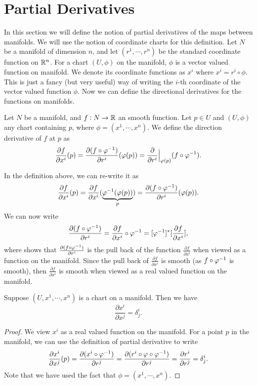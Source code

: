 \section{Partial Derivatives}
In this section we will define the notion of partial derivatives of the maps between manifolds. We will use the notion of coordinate charts for this definition. Let $ N $ be a manifold of dimension $ n $, and let $ (r^1,\cdots,r^n) $ be the standard coordinate function on $ \mathbb{R}^n $. For a chart $ (U,\phi) $ on the manifold, $ \phi $ is a vector valued function on manifold. We denote its coordinate functions as $ x^i $ where $ x^i = r^i \circ \phi $. This is just a fancy (but very useful) way of writing the $ i\text{-th}$ coordinate of the vector valued function $ \phi $. Now we can define the directional derivatives for the functions on manifolds.

\begin{definition}
	Let $ N $ be a manifold, and $ f:N \to \mathbb{R} $ an smooth function. Let $ p\in U $ and $ (U,\phi) $ any chart containing $ p $, where $ \phi = (x^1,\cdots,x^n) $. We define the direction derivative of $ f $ at $ p $ as 
	\[ \frac{\partial f}{\partial x^i}(p) = \frac{\partial (f\circ \varphi^{-1})}{\partial r^i}(\varphi(p)) = \frac{\partial}{\partial r^i}\big|_{\varphi(p)} (f\circ\varphi^{-1}). \]
\end{definition}

\begin{remark}
	In the definition above, we can re-write it as
	\[ \frac{\partial f}{\partial x^i}(p) =\frac{\partial f}{\partial x^i}(\underbrace{\varphi^{-1}(\varphi(p))}_{p}) = \frac{\partial (f\circ \varphi^{-1})}{\partial r^i}(\varphi(p)). \]
	We can now write
	\[ \frac{\partial (f\circ \varphi^{-1})}{\partial r^i} =\frac{\partial f}{\partial x^i} \circ \varphi^{-1} = [\varphi^{-1}]^* [\frac{\partial f}{\partial x^i}],  \]
	where shows that $ \frac{\partial (f\circ \varphi^{-1})}{\partial r^i} $ is the pull back of the function $ \frac{\partial f}{\partial x^i} $ when viewed as a function on the manifold. Since the pull back of $ \frac{\partial f}{\partial x^i} $ is smooth (as $ f\circ \varphi^{-1} $ is smooth), then $ \frac{\partial f}{\partial x^i} $ is smooth when viewed as a real valued function on the manifold.
\end{remark}

\begin{proposition}
	Suppose $ (U,x^1,\cdots,x^n) $ is a chart on a manifold. Then we have
	\[ \frac{\partial x^i}{\partial x^j} = \delta^i_j. \]
\end{proposition}
\begin{proof}
	We view $ x^i $ as a real valued function on the manifold. For a point $ p $ in the manifold, we can use the definition of partial derivative to write
	\[ \frac{\partial x^i}{\partial x^j}(p) = \frac{\partial (x^i \circ \varphi^{-1})}{\partial r^j} = \frac{\partial (r^i \circ \varphi \circ \varphi^{-1})}{\partial r^j} = \frac{\partial r^i}{\partial r^j} = \delta^i_j. \]
	Note that we have used the fact that $ \phi = (x^1,\cdots,x^n) $.
\end{proof}

